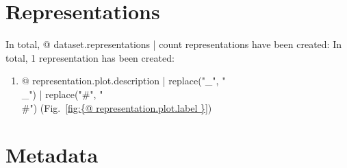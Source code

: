 



\section{Representations}

In total, {@ dataset.representations | count } representations have been created:
In total, 1 representation has been created:

\begin{enumerate}
\item {@ representation.plot.description | replace("_", "\\_") | replace("#", "\\#") } (Fig.~\ref{fig:{@ representation.plot.label }})
\end{enumerate}




\clearpage


\section{Metadata}




